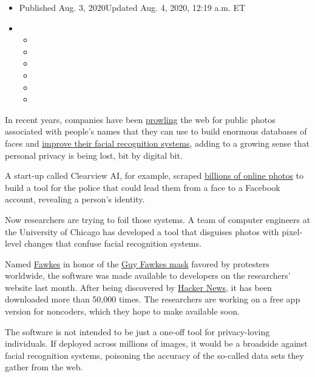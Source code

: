 \begin{itemize}
\item
  Published Aug. 3, 2020Updated Aug. 4, 2020, 12:19 a.m. ET
\item
  \begin{itemize}
  \item
  \item
  \item
  \item
  \item
  \item
  \end{itemize}
\end{itemize}

In recent years, companies have been
\href{https://onezero.medium.com/this-simple-facial-recognition-search-engine-can-track-you-down-across-the-internet-518c7129e454}{prowling}
the web for public photos associated with people's names that they can
use to build enormous databases of faces and
\href{https://www.nytimes.com/interactive/2019/10/11/technology/flickr-facial-recognition.html}{improve
their facial recognition systems}, adding to a growing sense that
personal privacy is being lost, bit by digital bit.

A start-up called Clearview AI, for example, scraped
\href{https://www.nytimes.com/2020/01/18/technology/clearview-privacy-facial-recognition.html}{billions
of online photos} to build a tool for the police that could lead them
from a face to a Facebook account, revealing a person's identity.

Now researchers are trying to foil those systems. A team of computer
engineers at the University of Chicago has developed a tool that
disguises photos with pixel-level changes that confuse facial
recognition systems.

Named \href{http://sandlab.cs.uchicago.edu/fawkes/}{Fawkes} in honor of
the
\href{https://www.nytimes.com/2019/11/05/opinion/guy-fawkes-day-v-for-vendetta.html}{Guy
Fawkes mask} favored by protesters worldwide, the software was made
available to developers on the researchers' website last month. After
being discovered by
\href{https://news.ycombinator.com/item?id=23917337}{Hacker News}, it
has been downloaded more than 50,000 times. The researchers are working
on a free app version for noncoders, which they hope to make available
soon.

The software is not intended to be just a one-off tool for
privacy-loving individuals. If deployed across millions of images, it
would be a broadside against facial recognition systems, poisoning the
accuracy of the so-called data sets they gather from the web.

